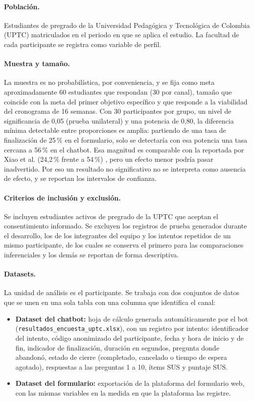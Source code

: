 \documentclass[12pt,letterpaper]{article}
\begin{document}
\paragraph{Población.} Estudiantes de pregrado de la Universidad Pedagógica y Tecnológica de Colombia (UPTC) matriculados en el periodo en que se aplica el estudio. La facultad de cada participante se registra como variable de perfil.

\paragraph{Muestra y tamaño.} La muestra es no probabilística, por conveniencia, y se fija como meta aproximadamente 60 estudiantes que respondan (30 por canal), tamaño que coincide con la meta del primer objetivo específico y que responde a la viabilidad del cronograma de 16 semanas. Con 30 participantes por grupo, un nivel de significancia de 0,05 (prueba unilateral) y una potencia de 0,80, la diferencia mínima detectable entre proporciones es amplia: partiendo de una tasa de finalización de 25\,\% en el formulario, solo se detectaría con esa potencia una tasa cercana a 56\,\% en el chatbot. Esa magnitud es comparable con la reportada por Xiao et al. (24,2\,\% frente a 54\,\%) \cite{xiao2020}, pero un efecto menor podría pasar inadvertido. Por eso un resultado no significativo no se interpreta como ausencia de efecto, y se reportan los intervalos de confianza.

\paragraph{Criterios de inclusión y exclusión.} Se incluyen estudiantes activos de pregrado de la UPTC que aceptan el consentimiento informado. Se excluyen los registros de prueba generados durante el desarrollo, los de los integrantes del equipo y los intentos repetidos de un mismo participante, de los cuales se conserva el primero para las comparaciones inferenciales y los demás se reportan de forma descriptiva.

\paragraph{Datasets.} La unidad de análisis es el participante. Se trabaja con dos conjuntos de datos que se unen en una sola tabla con una columna que identifica el canal:

\begin{itemize}
    \item \textbf{Dataset del chatbot:} hoja de cálculo generada automáticamente por el bot (\texttt{resultados\_\allowbreak encuesta\_\allowbreak uptc.xlsx}), con un registro por intento: identificador del intento, código anonimizado del participante, fecha y hora de inicio y de fin, indicador de finalización, duración en segundos, pregunta donde abandonó, estado de cierre (completado, cancelado o tiempo de espera agotado), respuestas a las preguntas 1 a 10, ítems SUS y puntaje SUS.
    \item \textbf{Dataset del formulario:} exportación de la plataforma del formulario web, con las mismas variables en la medida en que la plataforma las registre.
\end{itemize}
\end{document}

